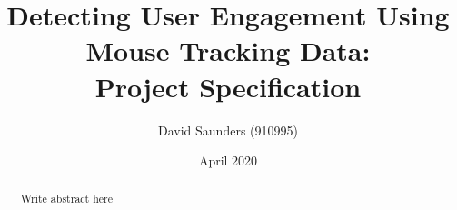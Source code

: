 \documentclass{article}
\title{Detecting User Engagement Using \\ Mouse Tracking Data:\\
    \large Project Specification
}
\author{David Saunders (910995)}
\date{April 2020}
\begin{document}
\maketitle

\begin{abstract} 
    Write abstract here
\end{abstract}

\tableofcontents






% 




\end{document}
